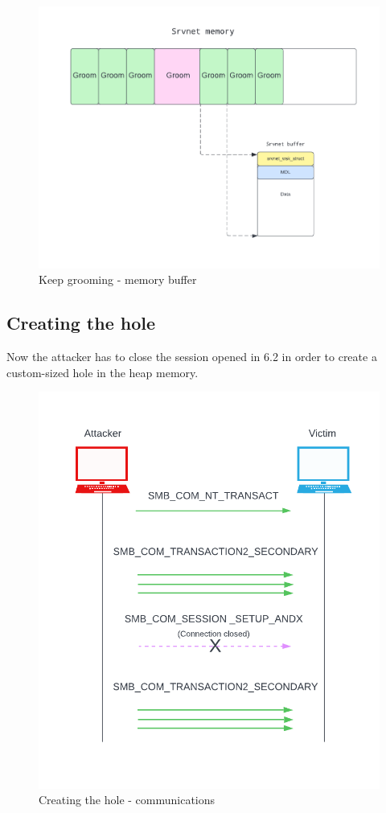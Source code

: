 \begin{figure}[ht!]
    \centering
      \includegraphics[scale=0.5]{images/exploit_3_buff.png}
      \caption{Keep grooming - memory buffer}
\end{figure}


\clearpage
\subsection{Creating the hole}
Now the attacker has to close the session opened in 6.2 in order to create a custom-sized hole in the heap memory.

\begin{figure}[ht!]
    \centering
      \includegraphics[scale=0.5]{images/exploit_4_comm.png}
      \caption{Creating the hole - communications}
\end{figure}

